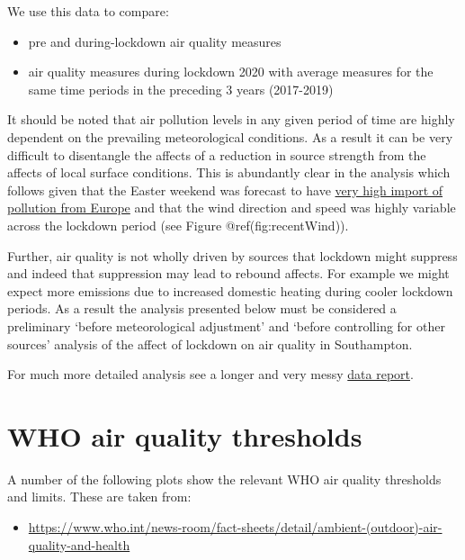 \documentclass[]{article}
\providecommand{\tightlist}{%
  \setlength{\itemsep}{0pt}\setlength{\parskip}{0pt}}
\begin{document}
We use this data to compare:

\begin{itemize}
\tightlist
\item
  pre and during-lockdown air quality measures
\item
  air quality measures during lockdown 2020 with average measures for
  the same time periods in the preceding 3 years (2017-2019)
\end{itemize}

It should be noted that air pollution levels in any given period of time
are highly dependent on the prevailing meteorological conditions. As a
result it can be very difficult to disentangle the affects of a
reduction in source strength from the affects of local surface
conditions. This is abundantly clear in the analysis which follows given
that the Easter weekend was forecast to have
\href{https://airqualitynews.com/2020/04/07/people-at-risk-from-coronavirus-warned-with-very-high-air-pollution-episode-predicted-for-uk/}{very
high import of pollution from Europe} and that the wind direction and
speed was highly variable across the lockdown period (see Figure
@ref(fig:recentWind)).

Further, air quality is not wholly driven by sources that lockdown might
suppress and indeed that suppression may lead to rebound affects. For
example we might expect more emissions due to increased domestic heating
during cooler lockdown periods. As a result the analysis presented below
must be considered a preliminary `before meteorological adjustment' and
`before controlling for other sources' analysis of the affect of
lockdown on air quality in Southampton.

For much more detailed analysis see a longer and very messy
\href{https://dataknut.github.io/airQual/sccAirQualExplore_Exploring\%20the\%20SSC\%20and\%20AURN\%20data.html}{data
report}.

\section{WHO air quality thresholds}\label{who-air-quality-thresholds}

A number of the following plots show the relevant WHO air quality
thresholds and limits. These are taken from:

\begin{itemize}
\tightlist
\item
  \url{https://www.who.int/news-room/fact-sheets/detail/ambient-(outdoor)-air-quality-and-health}
\end{itemize}
\end{document}
